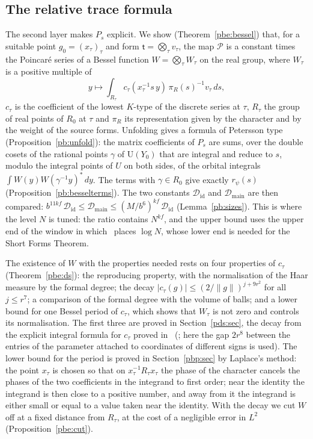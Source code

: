 \documentclass[10pt]{amsart}
\theoremstyle{definition}
\theoremstyle{remark}
\providecommand{\auP}{\mathcal P}
\providecommand{\auU}{\mathrm U}
\providecommand{\pbDid}{\mathcal D_{\mathrm{id}}}
\providecommand{\pbDmain}{\mathcal D_{\mathrm{main}}}
\providecommand{\pbrpsi}{r_\psi}
\begin{document}
\subsection*{The relative trace formula}
The second layer makes $P_s$ explicit. We show (Theorem~\ref{pbe:bessel}) that, for a suitable
point $g_0=(x_\tau)_\tau$ and form $\mathsf t=\bigotimes_\tau v_\tau$, the map $\auP$ is a
constant times the Poincar\'e series of a Bessel function $W=\bigotimes_\tau W_\tau$ on the real
group, where $W_\tau$ is a positive multiple of
\[
y\longmapsto\int_{R_\tau}c_\tau(x_\tau^{-1}s\,y)\,\pi_R(s)^{-1}v_\tau\,ds ,
\]
$c_\tau$ is the coefficient of the lowest $K$-type of the discrete series at $\tau$, $R_\tau$ the
group of real points of $R_0$ at $\tau$ and $\pi_R$ its representation given by the character and
by the weight of the source forms. Unfolding gives a formula of Petersson type
(Proposition~\ref{pb:unfold}): the matrix coefficients of $P_s$ are sums, over the double cosets
of the rational points $\gamma$ of $\auU(Y_0)$ that are integral and reduce to $s$, modulo the
integral points of $U$ on both sides, of the orbital integrals $\int W(y)W(\gamma^{-1}y)^*\,dy$.
The terms with $\gamma\in R_0$ give exactly $\pbrpsi(s)$ (Proposition~\ref{pb:besselterms}). The
two constants $\pbDid$ and $\pbDmain$ are then compared: $b^{11kf}\,\pbDid\le\pbDmain\le
(M/b^6)^{kf}\,\pbDid$ (Lemma~\ref{pb:sizes}). This is where the level $N$ is tuned: the ratio
contains $N^{kf}$, and the upper bound uses the upper end of the window in which~\cite{P46}
places $\log N$, whose lower end is needed for the Short Forms Theorem.

The existence of $W$ with the properties needed rests on four properties of $c_\tau$
(Theorem~\ref{pbe:ds}): the reproducing property, with the normalisation of the Haar measure by
the formal degree; the decay $|c_\tau(g)|\le(2/\|g\|)^{j+9r^2}$ for all $j\le r^7$; a comparison of
the formal degree with the volume of balls; and a lower bound for one Bessel period of $c_\tau$,
which shows that $W_\tau$ is not zero and controls its normalisation. The first three are proved
in Section~\ref{pds:sec}, the decay from the explicit integral formula for $c_\tau$ proved
in~\cite{P49} ({\cite[Theorem~3.17]{P49}}; here the gap $2r^8$ between the entries of the parameter
attached to coordinates of different signs is used). The lower bound for the period is proved in
Section~\ref{pbp:sec} by Laplace's method: the point $x_\tau$ is chosen so that on
$x_\tau^{-1}R_\tau x_\tau$ the phase of the character cancels the phases of the two coefficients
in the integrand to first order; near the identity the integrand is then close to a positive
number, and away from it the integrand is either small or equal to a value taken near the
identity. With the decay we cut $W$ off at a fixed distance from $R_\tau$, at the cost of a
negligible error in $L^2$ (Proposition~\ref{pbe:cut}).
\end{document}
